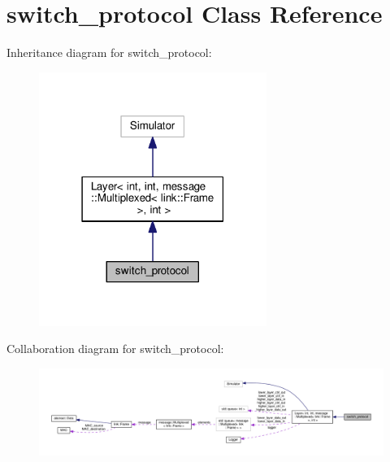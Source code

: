 \hypertarget{classswitch__protocol}{}\section{switch\+\_\+protocol Class Reference}
\label{classswitch__protocol}


Inheritance diagram for switch\+\_\+protocol\+:\nopagebreak
\begin{figure}[H]
\begin{center}
\leavevmode
\includegraphics[width=210pt]{classswitch__protocol__inherit__graph}
\end{center}
\end{figure}


Collaboration diagram for switch\+\_\+protocol\+:
\nopagebreak
\begin{figure}[H]
\begin{center}
\leavevmode
\includegraphics[width=350pt]{classswitch__protocol__coll__graph}
\end{center}
\end{figure}
